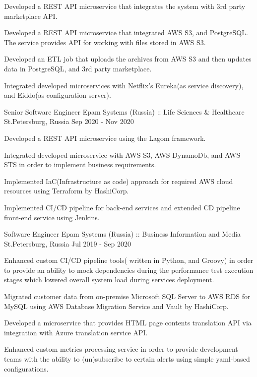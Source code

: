 \begin{cventries}
{\begin{cvitems}
    \item {Developed a REST API microservice that integrates the system with 3rd party marketplace API.}
    \item {Developed a REST API microservice that integrated AWS S3, and PostgreSQL. The service provides API for working with files stored in AWS S3.}
    \item {Developed an ETL job that uploads the archives from AWS S3 and then updates data in PostgreSQL, and 3rd party marketplace.}
    \item {Integrated developed microservices with Netflix's Eureka(as service discovery), and Eiddo(as configuration server).}
  \end{cvitems}
}

\cventry
{Senior Software Engineer} %
{Epam Systems (Russia) :: Life Sciences \& Healthcare} %
{St.Petersburg, Russia} %
{Sep 2020 - Nov 2020 } %
{
  \begin{cvitems} %
    \item {Developed a REST API microservice using the Lagom framework.}
    \item {Integrated developed microservice with AWS S3, AWS DynamoDb, and AWS STS in order to implement business requirements.}
    \item {Implemented IaC(Infrastructure as code) approach for required AWS cloud resources using Terraform by HashiCorp.}
    \item {Implemented CI/CD pipeline for back-end services and extended CD pipeline front-end service using Jenkins.}
  \end{cvitems}
}

\cventry
{Software Engineer} %
{Epam Systems (Russia) :: Business Information and Media} %
{St.Petersburg, Russia} %
{Jul 2019 - Sep 2020} %
{
  \begin{cvitems} %
    \item { Enhanced custom CI/CD pipeline tools( written in Python, and Groovy) 
    in order to provide an ability to mock dependencies during the performance test execution stages
     which lowered overall system load during services deployment.}
    \item {Migrated customer data from on-premise Microsoft SQL Server to AWS RDS for MySQL using AWS Database Migration Service and Vault by HashiCorp.}
    \item {Developed a microservice that provides HTML page contents translation API via integration with Azure translation service API.}
    \item {Enhanced custom metrics processing service in order to provide development teams with the ability to (un)subscribe to certain alerts using simple yaml-based configurations.}
  \end{cvitems}
}


\end{cventries}
